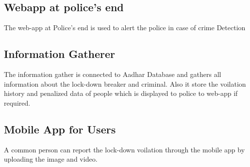 \documentclass[10pt,twocolumn,letterpaper]{article}
\begin{document}
\subsection{Webapp at police's end}
The web-app at Police's end is used to alert the police in case of crime Detection

\subsection{Information Gatherer}
The information gather is connected to Aadhar Database and gathers all information about the lock-down breaker and criminal.
Also it store the voilation history and penalized data of people which is displayed to police to web-app if required.

\subsection{Mobile App for Users}
A common person can report the lock-down voilation through the mobile app by uploading the image and video.
\end{document}
